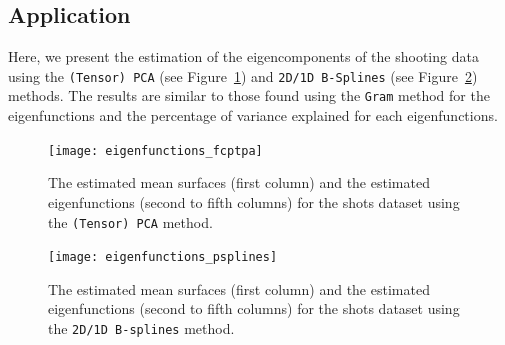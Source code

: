 
\subsection{Application} %
\label{sub:application}

Here, we present the estimation of the eigencomponents of the shooting data using the \texttt{(Tensor) PCA} (see Figure~\ref{fig:eigenfunctions_fcptpa}) and \texttt{2D/1D B-Splines} (see Figure~\ref{fig:eigenfunctions_psplines}) methods. The results are similar to those found using the \texttt{Gram} method for the eigenfunctions and the percentage of variance explained for each eigenfunctions.

\begin{figure}
    \centering
    \texttt{[image: eigenfunctions\_fcptpa]}
    \caption{The estimated mean surfaces (first column) and the estimated eigenfunctions (second to fifth columns) for the shots dataset using the \texttt{(Tensor) PCA} method.}
    \label{fig:eigenfunctions_fcptpa}
\end{figure}

\begin{figure}
    \centering
    \texttt{[image: eigenfunctions\_psplines]}
    \caption{The estimated mean surfaces (first column) and the estimated eigenfunctions (second to fifth columns) for the shots dataset using the \texttt{2D/1D B-splines} method.}
    \label{fig:eigenfunctions_psplines}
\end{figure}



